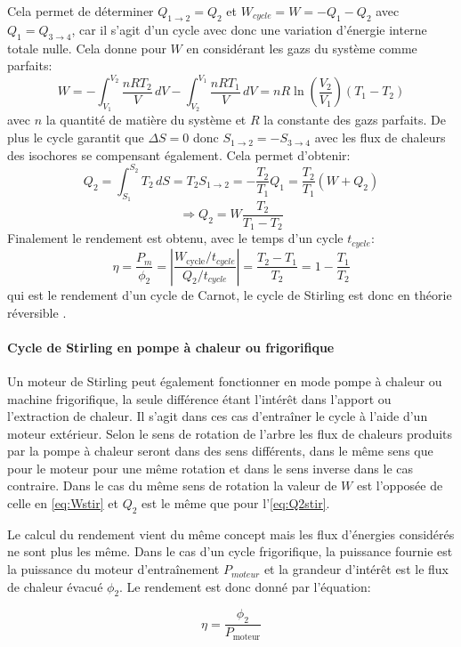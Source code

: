 Cela permet de déterminer \(Q_{1\to2} = Q_2\) et \(W_{cycle} = W = -Q_1 - Q_2\) avec \(Q_1 = Q_{3\to4}\), car il s'agit d'un cycle avec donc une variation d'énergie interne totale nulle. Cela donne pour \(W\) en considérant les gazs du système comme parfaits:
\begin{equation}
    W = - \int_{V_1}^{V_2} \frac{nRT_2}{V} \, dV - \int_{V_2}^{V_1} \frac{nRT_1}{V} \, dV = nR\ln\left(\frac{V_2}{V_1}\right) (T_1 - T_2)
    \label{eq:Wstir}
\end{equation}
avec \(n\) la quantité de matière du système et \(R\) la constante des gazs parfaits.
De plus le cycle garantit que \(\Delta S = 0\) donc \(S_{1\to2} = -S_{3\to4}\) avec les flux de chaleurs des isochores se compensant également. Cela permet d'obtenir:
\begin{equation}
    Q_2 = \int_{S_1}^{S_2} T_2 \, dS = T_2 S_{1\to2} = -\frac{T_2}{T_1} Q_1 = \frac{T_2}{T_1} (W + Q_2)
\end{equation}
\begin{equation}
    \Rightarrow Q_2 = W \frac{T_2}{T_1 - T_2}
    \label{eq:Q2stir}
\end{equation}
Finalement le rendement est obtenu, avec le temps d'un cycle \(t_{cycle}\):
\begin{equation}
    \eta = \frac{P_m}{\phi_2} = \left|\frac{W_\textrm{cycle}/t_{cycle}}{Q_2/t_{cycle}}\right| = \frac{T_2 - T_1}{T_2} = 1 - \frac{T_1}{T_2}
    \label{eq:rend-theorie}
\end{equation}
qui est le rendement d'un cycle de Carnot, le cycle de Stirling est donc en théorie réversible \cite{cours-thermo}.

\paragraph*{Cycle de Stirling en pompe à chaleur ou frigorifique}
Un moteur de Stirling peut également fonctionner en mode pompe à chaleur ou machine frigorifique, la seule différence étant l'intérêt dans l'apport ou l'extraction de chaleur. Il s'agit dans ces cas d'entraîner le cycle à l'aide d'un moteur extérieur. Selon le sens de rotation de l'arbre les flux de chaleurs produits par la pompe à chaleur seront dans des sens différents, dans le même sens que pour le moteur pour une même rotation et dans le sens inverse dans le cas contraire. Dans le cas du même sens de rotation la valeur de \(W\) est l'opposée de celle en \autoref{eq:Wstir} et \(Q_2\) est le même que pour l'\autoref{eq:Q2stir}.

Le calcul du rendement vient du même concept mais les flux d'énergies considérés ne sont plus les même. Dans le cas d'un cycle frigorifique, la puissance fournie est la puissance du moteur d'entraînement \(P_{moteur}\) et la grandeur d'intérêt est le flux de chaleur évacué \(\phi_2\). Le rendement est donc donné par l'équation:

\begin{equation}
    \eta = \frac{\phi_2}{P_\textrm{moteur}}
    \label{eq:rend-frigo}
\end{equation}